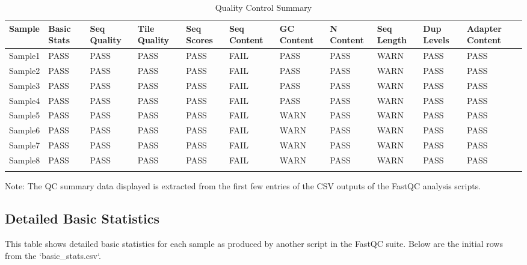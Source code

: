 \documentclass[unnumsec,webpdf,contemporary,large]{oup-authoring-template}%
\theoremstyle{thmstyleone}%
\theoremstyle{thmstyletwo}%
\theoremstyle{thmstylethree}%
\begin{document}
\begin{table}[htbp]
\caption{Quality Control Summary\label{tab1}}
\centering
\begin{tabular}{@{}lllllllllll@{}}
\toprule
Sample & Basic Stats & Seq Quality & Tile Quality & Seq Scores & Seq Content & GC Content & N Content & Seq Length & Dup Levels & Adapter Content \\
\midrule
Sample1 & PASS & PASS & PASS & PASS & FAIL & PASS & PASS & WARN & PASS & PASS \\
Sample2 & PASS & PASS & PASS & PASS & FAIL & PASS & PASS & WARN & PASS & PASS \\
Sample3 & PASS & PASS & PASS & PASS & FAIL & PASS & PASS & WARN & PASS & PASS \\
Sample4 & PASS & PASS & PASS & PASS & FAIL & PASS & PASS & WARN & PASS & PASS \\
Sample5 & PASS & PASS & PASS & PASS & FAIL & WARN & PASS & WARN & PASS & PASS \\
Sample6 & PASS & PASS & PASS & PASS & FAIL & WARN & PASS & WARN & PASS & PASS \\
Sample7 & PASS & PASS & PASS & PASS & FAIL & WARN & PASS & WARN & PASS & PASS \\
Sample8 & PASS & PASS & PASS & PASS & FAIL & WARN & PASS & WARN & PASS & PASS \\
\botrule
\end{tabular}
\begin{tablenotes}%
\item Note: The QC summary data displayed is extracted from the first few entries of the CSV outputs of the FastQC analysis scripts.
\end{tablenotes}
\end{table}

\subsection{Detailed Basic Statistics}

This table shows detailed basic statistics for each sample as produced by another script in the FastQC suite. Below are the initial rows from the `basic_stats.csv`.
\end{document}
